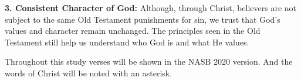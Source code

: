\textbf{3. Consistent Character of God:} 
Although, through Christ, believers are not subject to the same Old Testament punishments for sin, we trust that God's values and character remain unchanged. The principles seen in the Old Testament still help us understand who God is and what He values.\\

\vspace{2\baselineskip}

Throughout this study verses will be shown in the NASB 2020 version. And the words of Christ will be noted with an asterisk.
